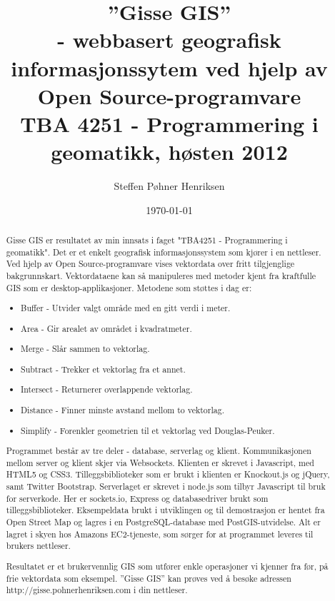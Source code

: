 \documentclass[12pt,twoside,onecolumn]{article}
\title{\textbf{''Gisse GIS''  \\- webbasert geografisk informasjonssytem ved hjelp av\\ Open Source-programvare}
\\ \normalsize TBA 4251 - Programmering i geomatikk, høsten 2012}
\author{Steffen Pøhner Henriksen}
\date{\today}
\makeatletter
\def\maketitle{%
  \null
  \thispagestyle{empty}%
  \vskip 1cm
  \begin{flushright}
    \normalfont\huge\@title\par
  \end{flushright}
  \vfil
  \begin{flushright}
    \LARGE \strut \@author \par
  \end{flushright}
  \par
  \vfil
  \vfil
  \null
  }
\makeatother
\begin{document}
\maketitle

\vspace{3cm}

\pagebreak

\begin{abstract}

	Gisse GIS er resultatet av min innsats i faget "TBA4251 - Programmering i geomatikk". Det er et enkelt geografisk informasjonssystem som kjører i en nettleser. Ved hjelp av Open Source-programvare vises vektordata over fritt tilgjenglige bakgrunnskart. Vektordataene kan så manipuleres med metoder kjent fra kraftfulle GIS som er desktop-applikasjoner. Metodene som støttes i dag er:
	
	\begin{itemize}
		\item Buffer - Utvider valgt område med en gitt verdi i meter.
		\item Area - Gir arealet av området i kvadratmeter.
		\item Merge - Slår sammen to vektorlag.
		\item Subtract - Trekker et vektorlag fra et annet.
		\item Intersect - Returnerer overlappende vektorlag.
		\item Distance - Finner minste avstand mellom to vektorlag.
		\item Simplify - Forenkler geometrien til et vektorlag ved Douglas-Peuker. 
	\end{itemize}
	
	Programmet består av tre deler - database, serverlag og klient. Kommunikasjonen mellom server og klient skjer via Websockets\cite{websockets}. Klienten er skrevet i Javascript, med HTML5 og CSS3. Tilleggsbiblioteker som er brukt i klienten er Knockout.js\cite{knockout} og jQuery\cite{jquery}, samt Twitter Bootstrap\cite{bootstrap}. Serverlaget er skrevet i node.js som tilbyr Javascript til bruk for serverkode. Her er sockets.io\cite{sockets}, Express og databasedriver brukt som tilleggsbiblioteker. Eksempeldata brukt i utviklingen og til demostrasjon er hentet fra Open Street Map og lagres i en PostgreSQL-database med PostGIS-utvidelse\cite{postgis}. Alt er lagret i skyen hos Amazons EC2-tjeneste\cite{ec2}, som sørger for at programmet leveres til brukers nettleser. 
	
	Resultatet er et brukervennlig GIS som utfører enkle operasjoner vi kjenner fra før, på frie vektordata som eksempel. ''Gisse GIS'' kan prøves ved å besøke adressen http://gisse.pohnerhenriksen.com i din nettleser.
	
\end{abstract}
\newpage
\end{document}
